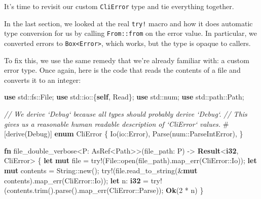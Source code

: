 \documentclass[a4paper,]{book}
\newenvironment{Shaded}{\begin{snugshade}}{\end{snugshade}}
\newcommand{\KeywordTok}[1]{\textcolor[rgb]{0.13,0.29,0.53}{\textbf{{#1}}}}
\newcommand{\DecValTok}[1]{\textcolor[rgb]{0.00,0.00,0.81}{{#1}}}
\newcommand{\CommentTok}[1]{\textcolor[rgb]{0.56,0.35,0.01}{\textit{{#1}}}}
\newcommand{\OtherTok}[1]{\textcolor[rgb]{0.56,0.35,0.01}{{#1}}}
\newcommand{\NormalTok}[1]{{#1}}
\begin{document}
It's time to revisit our custom \texttt{CliError} type and tie
everything together.


In the last section, we looked at the real \texttt{try!} macro and how
it does automatic type conversion for us by calling \texttt{From::from}
on the error value. In particular, we converted errors to
\texttt{Box\textless{}Error\textgreater{}}, which works, but the type is
opaque to callers.

To fix this, we use the same remedy that we're already familiar with: a
custom error type. Once again, here is the code that reads the contents
of a file and converts it to an integer:

\begin{Shaded}
\begin{Highlighting}[]
\KeywordTok{use} \NormalTok{std::fs::File;}
\KeywordTok{use} \NormalTok{std::io::\{}\KeywordTok{self}\NormalTok{, Read\};}
\KeywordTok{use} \NormalTok{std::num;}
\KeywordTok{use} \NormalTok{std::path::Path;}

\CommentTok{// We derive `Debug` because all types should probably derive `Debug`.}
\CommentTok{// This gives us a reasonable human readable description of `CliError` values.}
\OtherTok{#[}\NormalTok{derive}\OtherTok{(}\NormalTok{Debug}\OtherTok{)]}
\KeywordTok{enum} \NormalTok{CliError \{}
    \NormalTok{Io(io::Error),}
    \NormalTok{Parse(num::ParseIntError),}
\NormalTok{\}}

\KeywordTok{fn} \NormalTok{file_double_verbose<P: AsRef<Path>>(file_path: P) -> }\KeywordTok{Result}\NormalTok{<}\KeywordTok{i32}\NormalTok{, CliError> \{}
    \KeywordTok{let} \KeywordTok{mut} \NormalTok{file = }\OtherTok{try!}\NormalTok{(File::open(file_path).map_err(CliError::Io));}
    \KeywordTok{let} \KeywordTok{mut} \NormalTok{contents = String::new();}
    \OtherTok{try!}\NormalTok{(file.read_to_string(&}\KeywordTok{mut} \NormalTok{contents).map_err(CliError::Io));}
    \KeywordTok{let} \NormalTok{n: }\KeywordTok{i32} \NormalTok{= }\OtherTok{try!}\NormalTok{(contents.trim().parse().map_err(CliError::Parse));}
    \KeywordTok{Ok}\NormalTok{(}\DecValTok{2} \NormalTok{* n)}
\NormalTok{\}}
\end{Highlighting}
\end{Shaded}
\end{document}
